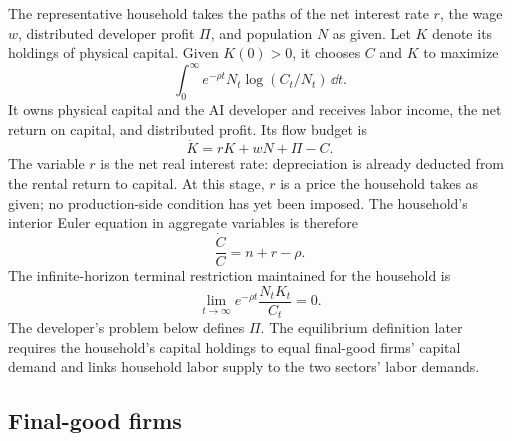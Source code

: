 The representative household takes the paths of the net interest rate \(r\),
the wage \(w\), distributed developer profit \(\Pi\), and population \(N\) as
given. Let \(K\) denote its holdings of physical capital. Given \(K(0)>0\), it
chooses \(C\) and \(K\) to maximize
\[
 \int_0^\infty e^{-\rho t}N_t\log(C_t/N_t)\,\dd t.
\]
It owns physical capital and the AI developer and receives labor income, the net
return on capital, and distributed profit. Its flow budget is
\begin{equation}
 \dot K=rK+wN+\Pi-C.
 \label{eq:axm-household-budget}
\end{equation}
The variable \(r\) is the net real interest rate: depreciation is already
deducted from the rental return to capital. At this stage, \(r\) is a price the
household takes as given; no production-side condition has yet been imposed. The
household's interior Euler equation in aggregate variables is therefore
\begin{equation}
 \frac{\dot C}{C}=n+r-\rho.
 \label{eq:axm-euler}
\end{equation}
The infinite-horizon terminal restriction maintained for the household is
\begin{equation}
 \lim_{t\to\infty}e^{-\rho t}\frac{N_tK_t}{C_t}=0.
 \label{eq:axm-household-tvc}
\end{equation}
The developer's problem below defines \(\Pi\). The equilibrium definition later
requires the household's capital holdings to equal final-good firms' capital
demand and links household labor supply to the two sectors' labor demands.

\subsection{Final-good firms}

